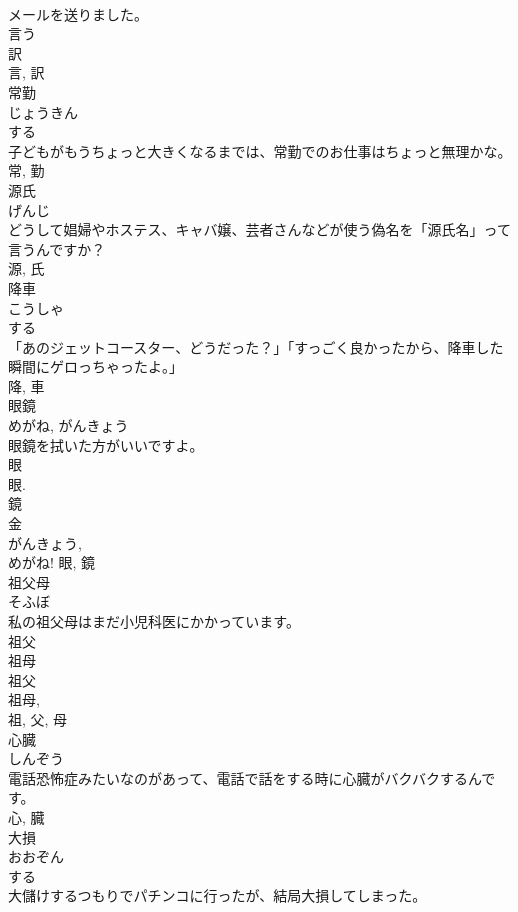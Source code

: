 \documentclass[8pt]{extreport}
\begin{document}
\begin{CJK}{UTF8}{min}
\\	メールを送りました。	
\\	言う 
\\	訳 
\\	言, 訳	
\\	常勤	
\\	じょうきん	
\\	する 
\\	子どもがもうちょっと大きくなるまでは、常勤でのお仕事はちょっと無理かな。	
\\	常, 勤	
\\	源氏	
\\	げんじ	
\\	どうして娼婦やホステス、キャバ嬢、芸者さんなどが使う偽名を「源氏名」って言うんですか？	
\\	源, 氏	
\\	降車	
\\	こうしゃ	
\\	する 
\\	「あのジェットコースター、どうだった？」「すっごく良かったから、降車した瞬間にゲロっちゃったよ。」	
\\	降, 車	
\\	眼鏡	
\\	めがね, がんきょう	
\\	眼鏡を拭いた方がいいですよ。	
\\	眼 
\\	眼. 
\\	鏡 
\\	金 
\\	がんきょう, 
\\	めがね!	眼, 鏡	
\\	祖父母	
\\	そふぼ	
\\	私の祖父母はまだ小児科医にかかっています。	
\\	祖父 
\\	祖母 
\\	祖父 
\\	祖母, 
\\	祖, 父, 母	
\\	心臓	
\\	しんぞう	
\\	電話恐怖症みたいなのがあって、電話で話をする時に心臓がバクバクするんです。	
\\	心, 臓	
\\	大損	
\\	おおぞん	
\\	する 
\\	大儲けするつもりでパチンコに行ったが、結局大損してしまった。	

\end{CJK}
\end{document}
